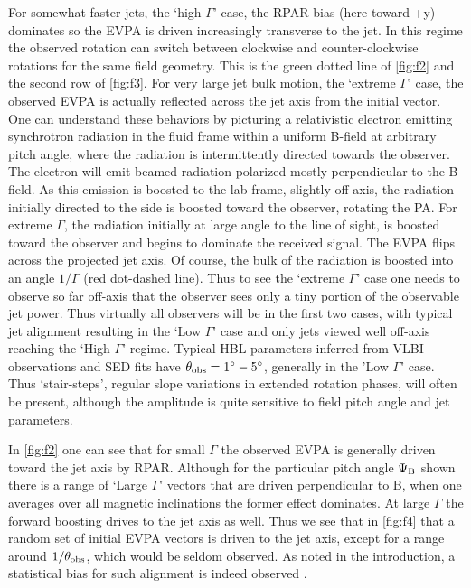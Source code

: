 For somewhat faster jets, the `high $\Gamma$' case, the RPAR bias (here toward +y) dominates so the EVPA is driven increasingly transverse to the jet. In this regime the observed rotation can switch between clockwise and counter-clockwise rotations for the same field geometry. This is the green dotted line of \cref{fig:f2} and the second row of \cref{fig:f3}. For very large jet bulk motion, the `extreme $\Gamma$' case, the observed EVPA is actually reflected across the jet axis from the initial vector. %
One can understand these behaviors by picturing a relativistic electron emitting synchrotron radiation in the fluid frame within a uniform B-field at arbitrary pitch angle, where the radiation is intermittently directed towards the observer. The electron will emit beamed radiation polarized mostly perpendicular to the B-field. As this emission is boosted to the lab frame, slightly off axis, the radiation initially directed to the side is boosted toward the observer, rotating the PA. For extreme $\Gamma$, the radiation initially at large angle to the line of sight, is boosted toward the observer and begins to dominate the received signal. The EVPA flips across the projected jet axis.
%
Of course, the bulk of the radiation is boosted into an angle $1/\Gamma$ (red dot-dashed line). Thus to see the `extreme $\Gamma$' case one needs to observe so far off-axis that the observer sees only a tiny portion of the observable jet power. Thus virtually all observers will be in the first two cases, with typical jet alignment resulting in the `Low $\Gamma$' case and only jets viewed well off-axis reaching the `High $\Gamma$' regime. Typical HBL parameters inferred from VLBI observations and SED fits have $\theta_{\rm obs} = 1^{\circ} - 5^{\circ}$, generally in the 'Low $\Gamma$' case. Thus `stair-steps', regular slope variations in extended rotation phases, will often be present, although the amplitude is quite sensitive to field pitch angle and jet parameters.

In \cref{fig:f2} one can see that for small $\Gamma$ the observed EVPA is generally driven toward the jet axis by RPAR. Although for the particular pitch angle $\Psi_{\rm B}$ shown there is a range of `Large $\Gamma$' vectors that are driven perpendicular to B, when one averages over all magnetic inclinations the former effect dominates. At large $\Gamma$ the forward boosting drives to the jet axis as well. Thus we see that in \cref{fig:f4} that a random set of initial EVPA vectors is driven to the jet axis, except for a range around $1/\theta_{\rm obs}$, which would be seldom observed. As noted in the introduction, a statistical bias for such alignment is indeed observed \citep{jorstad_multifrequency_2006}.

